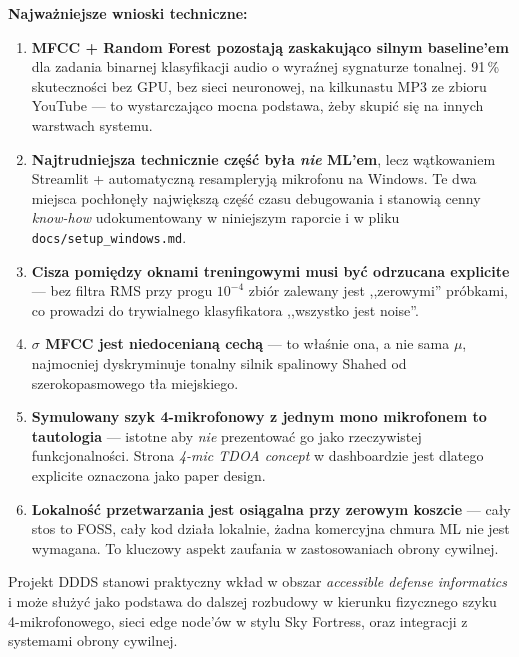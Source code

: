 \documentclass[11pt,a4paper]{article}
\begin{document}
\textbf{Najważniejsze wnioski techniczne:}
\begin{enumerate}[noitemsep]
  \item \textbf{MFCC + Random Forest pozostają zaskakująco silnym baseline'em}
        dla zadania binarnej klasyfikacji audio o wyraźnej sygnaturze
        tonalnej. 91\,\% skuteczności bez GPU, bez sieci neuronowej, na
        kilkunastu MP3 ze zbioru YouTube --- to wystarczająco mocna podstawa,
        żeby skupić się na innych warstwach systemu.
  \item \textbf{Najtrudniejsza technicznie część była \emph{nie} ML'em}, lecz
        wątkowaniem Streamlit + automatyczną resampleryją mikrofonu na
        Windows. Te dwa miejsca pochłonęły największą część czasu debugowania
        i stanowią cenny \emph{know-how} udokumentowany w niniejszym
        raporcie i w pliku \texttt{docs/setup\_windows.md}.
  \item \textbf{Cisza pomiędzy oknami treningowymi musi być odrzucana
        explicite} --- bez filtra RMS przy progu $10^{-4}$ zbiór zalewany jest
        ,,zerowymi'' próbkami, co prowadzi do trywialnego klasyfikatora
        ,,wszystko jest noise''.
  \item \textbf{$\sigma$ MFCC jest niedocenianą cechą} --- to właśnie ona,
        a nie sama $\mu$, najmocniej dyskryminuje tonalny silnik spalinowy
        Shahed od szerokopasmowego tła miejskiego.
  \item \textbf{Symulowany szyk 4-mikrofonowy z jednym mono mikrofonem to
        tautologia} --- istotne aby \emph{nie} prezentować go jako rzeczywistej
        funkcjonalności. Strona \emph{4-mic TDOA concept} w dashboardzie
        jest dlatego explicite oznaczona jako paper design.
  \item \textbf{Lokalność przetwarzania jest osiągalna przy zerowym
        koszcie} --- cały stos to FOSS, cały kod działa lokalnie, żadna
        komercyjna chmura ML nie jest wymagana. To kluczowy aspekt zaufania
        w zastosowaniach obrony cywilnej.
\end{enumerate}

Projekt DDDS stanowi praktyczny wkład w obszar \emph{accessible defense
informatics} i może służyć jako podstawa do dalszej rozbudowy w kierunku
fizycznego szyku 4-mikrofonowego, sieci edge node'ów w stylu Sky Fortress,
oraz integracji z systemami obrony cywilnej.
\end{document}
